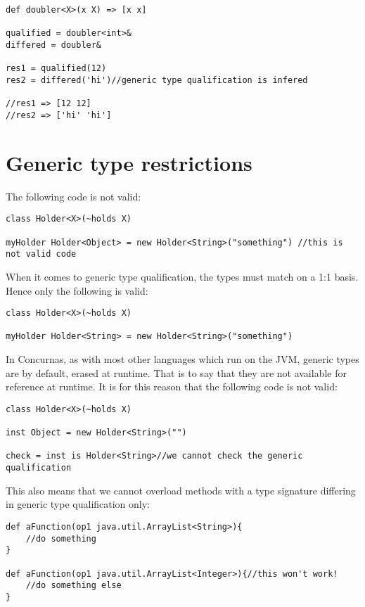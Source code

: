 \documentclass[conc-doc]{subfiles}
\begin{document}
\begin{lstlisting}
def doubler<X>(x X) => [x x]

qualified = doubler<int>&
differed = doubler&

res1 = qualified(12)
res2 = differed('hi')//generic type qualification is infered

//res1 => [12 12]
//res2 => ['hi' 'hi']
\end{lstlisting}

\section{Generic type restrictions}
The following code is not valid:

\begin{lstlisting}
class Holder<X>(~holds X)

myHolder Holder<Object> = new Holder<String>("something") //this is not valid code
\end{lstlisting}

When it comes to generic type qualification, the types must match on a 1:1 basis. Hence only the following is valid:

\begin{lstlisting}
class Holder<X>(~holds X)

myHolder Holder<String> = new Holder<String>("something")
\end{lstlisting}

In Concurnas, as with most other languages which run on the JVM, generic types are by default, erased at runtime. That is to say that they are not available for reference at runtime. It is for this reason that the following code is not valid:

\begin{lstlisting}
class Holder<X>(~holds X)

inst Object = new Holder<String>("")

check = inst is Holder<String>//we cannot check the generic qualification
\end{lstlisting}

This also means that we cannot overload methods with a type signature differing in generic type qualification only:

\begin{lstlisting}
def aFunction(op1 java.util.ArrayList<String>){
	//do something
}

def aFunction(op1 java.util.ArrayList<Integer>){//this won't work!
	//do something else
}
\end{lstlisting}
\end{document}
